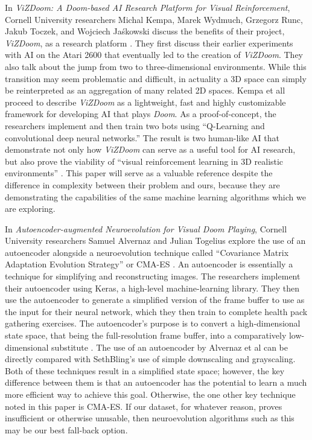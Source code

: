 In {\it ViZDoom: A Doom-based AI Research Platform for Visual Reinforcement}, Cornell University researchers Michal Kempa, Marek Wydmuch, Grzegorz Runc, Jakub Toczek, and Wojciech Jaśkowski discuss the benefits of their project, {\it ViZDoom}, as a research platform \cite{Kempka:2016}. They first discuss their earlier experiments with AI on the Atari 2600 that eventually led to the creation of {\it ViZDoom}. They also talk about the jump from two to three-dimensional environments. While this transition may seem problematic and difficult, in actuality a 3D space can simply be reinterpreted as an aggregation of many related 2D spaces. Kempa et all proceed to describe {\it ViZDoom} as a lightweight, fast and highly customizable framework for developing AI that plays {\it Doom}. As a proof-of-concept, the researchers implement and then train two bots using ``Q-Learning and convolutional deep neural networks.'' The result is two human-like AI that demonstrate not only how {\it ViZDoom} can serve as a useful tool for AI research, but also prove the viability of ``visual reinforcement learning in 3D realistic environments'' \cite{Kempka:2016}. This paper will serve as a valuable reference despite the difference in complexity between their problem and ours, because they are demonstrating the capabilities of the same machine learning algorithms which we are exploring.

In {\it Autoencoder-augmented Neuroevolution for Visual Doom Playing}, Cornell University researchers Samuel Alvernaz and Julian Togelius explore the use of an autoencoder alongside a neuroevolution technique called ``Covariance Matrix Adaptation Evolution Strategy'' or CMA-ES \cite{Alvernaz:2017}. An autoencoder is essentially a technique for simplifying and reconstructing images. The researchers implement their autoencoder using Keras, a high-level machine-learning library. They then use the autoencoder to generate a simplified version of the frame buffer to use as the input for their neural network, which they then train to complete health pack gathering exercises. The autoencoder's purpose is to convert a high-dimensional state space, that being the full-resolution frame buffer, into a comparatively low-dimensional substitute \cite{Alvernaz:2017}. The use of an autoencoder by Alvernaz et al can be directly compared with SethBling's use of simple downscaling and grayscaling. Both of these techniques result in a simplified state space; however, the key difference between them is that an autoencoder has the potential to learn a much more efficient way to achieve this goal. Otherwise, the one other key technique noted in this paper is CMA-ES. If our dataset, for whatever reason, proves insufficient or otherwise unusable, then neuroevolution algorithms such as this may be our best fall-back option.

